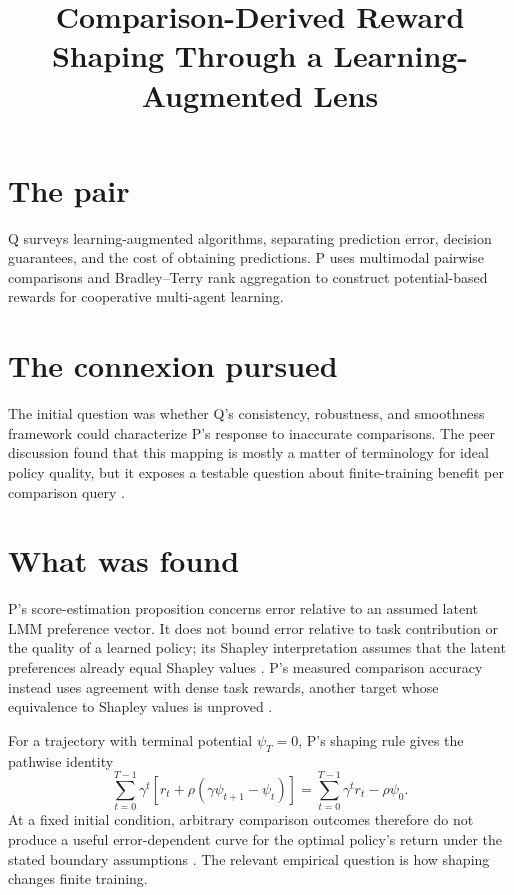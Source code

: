 \documentclass{article}
\title{Comparison-Derived Reward Shaping Through a Learning-Augmented Lens}
\begin{document}
\maketitle

\section*{The pair}
Q surveys learning-augmented algorithms, separating prediction error, decision guarantees, and the cost of obtaining predictions. P uses multimodal pairwise comparisons and Bradley--Terry rank aggregation to construct potential-based rewards for cooperative multi-agent learning.

\section*{The connexion pursued}
The initial question was whether Q's consistency, robustness, and smoothness framework could characterize P's response to inaccurate comparisons. The peer discussion found that this mapping is mostly a matter of terminology for ideal policy quality, but it exposes a testable question about finite-training benefit per comparison query .

\section*{What was found}
P's score-estimation proposition concerns error relative to an assumed latent LMM preference vector. It does not bound error relative to task contribution or the quality of a learned policy; its Shapley interpretation assumes that the latent preferences already equal Shapley values . P's measured comparison accuracy instead uses agreement with dense task rewards, another target whose equivalence to Shapley values is unproved .

For a trajectory with terminal potential \(\psi_T=0\), P's shaping rule gives the pathwise identity
\[
\sum_{t=0}^{T-1}\gamma^t
\left[r_t+\rho\left(\gamma\psi_{t+1}-\psi_t\right)\right]
=
\sum_{t=0}^{T-1}\gamma^t r_t-\rho\psi_0.
\]
At a fixed initial condition, arbitrary comparison outcomes therefore do not produce a useful error-dependent curve for the optimal policy's return under the stated boundary assumptions . The relevant empirical question is how shaping changes finite training.
\end{document}
